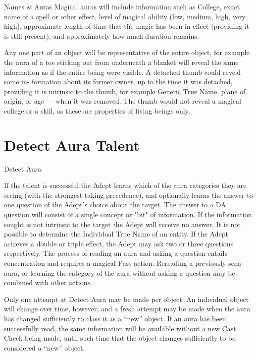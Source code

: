 \begin{Chapter}{Names \& Auras}
Magical auras will include information such as College, exact name of
a spell or other effect, level of magical ability (low, medium, high,
very high), approximate length of time that the magic has been in
effect (providing it is still present), and approximately how much
duration remains.

Any one part of an object will be representative of the entire object,
for example the aura of a toe sticking out from underneath a blanket
will reveal the same information as if the entire being were visible.
A detached thumb could reveal some in- formation about its former
owner, up to the time it was detached, providing it is intrinsic to
the thumb, for example Generic True Name, plane of origin, or age —
when it was removed. The thumb would not reveal a magical college or a
skill, as these are properties of living beings only.

\section{Detect Aura Talent}

\begin{talent}{Detect Aura}
\begin{effects}
If the talent is successful the Adept learns which of the aura
categories they are seeing (with the strongest taking precedence), and
optionally learns the answer to one question of the Adept’s choice
about the target. The answer to a DA question will consist of a single
concept or "bit" of information. If the information sought is not
intrinsic to the target the Adept will receive no answer.  It is not
possible to determine the Individual True Name of an entity.  If the
Adept achieves a double or triple effect, the Adept may ask two or
three questions respectively.  The process of reading an aura and
asking a question entails concentration and requires a magical Pass
action.  Rereading a previously seen aura, or learning the category of
the aura without asking a question may be combined with other actions.

Only one attempt at Detect Aura may be made per object. An individual
object will change over time, however, and a fresh attempt may be made
when the aura has changed sufficiently to class it as a “new”
object. If an aura has been successfully read, the same information
will be available without a new Cast Check being made, until such time
that the object changes sufficiently to be considered a “new” object.


\end{effects}
\end{talent}
\end{Chapter}
